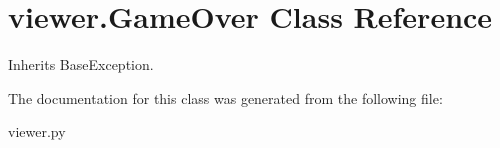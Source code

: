 \hypertarget{classviewer_1_1_game_over}{}\section{viewer.\+Game\+Over Class Reference}
\label{classviewer_1_1_game_over}


Inherits Base\+Exception.



The documentation for this class was generated from the following file\+:\begin{DoxyCompactItemize}
\item 
viewer.\+py\end{DoxyCompactItemize}
